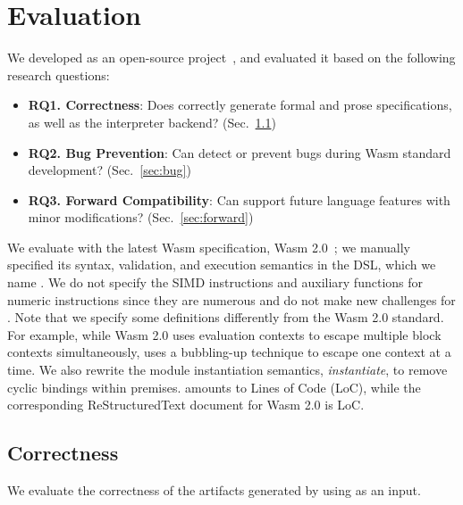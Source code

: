 \section{Evaluation}
\label{sec:eval}
We developed \dslname as an open-source project~\cite{spectec}, and
evaluated it based on the following research questions:
\begin{itemize}
\item \textbf{RQ1. Correctness}:
Does \dslname correctly generate formal and prose specifications, as well as the interpreter backend?
(Sec.~\ref{sec:correctness})
\item \textbf{RQ2. Bug Prevention}:
Can \dslname detect or prevent bugs during Wasm standard development?
(Sec.~\ref{sec:bug})
\item \textbf{RQ3. Forward Compatibility}:
Can \dslname support future language features with minor modifications?
(Sec.~\ref{sec:forward})
\end{itemize}

We evaluate \dslname with the latest Wasm specification, Wasm 2.0~\cite{wasmspec};
we manually specified its syntax, validation, and execution semantics
in the DSL, which we name \specdsl. We do not specify the SIMD
instructions and auxiliary functions for numeric instructions
since they are numerous and do not make new challenges for \dslname.
Note that we specify some definitions differently from the Wasm 2.0 standard.
For example, while Wasm 2.0 uses evaluation contexts to escape multiple block contexts
simultaneously, \specdsl uses a bubbling-up technique to escape one context at a time.
We also rewrite the module instantiation semantics, \textit{instantiate},
to remove cyclic bindings within premises.
\specdsl amounts to  Lines of Code (LoC),
while the corresponding ReStructuredText document for Wasm 2.0 is
 LoC.

\subsection{Correctness}\label{sec:correctness}
We evaluate the correctness of the artifacts generated by \dslname using \specdsl as an input.

